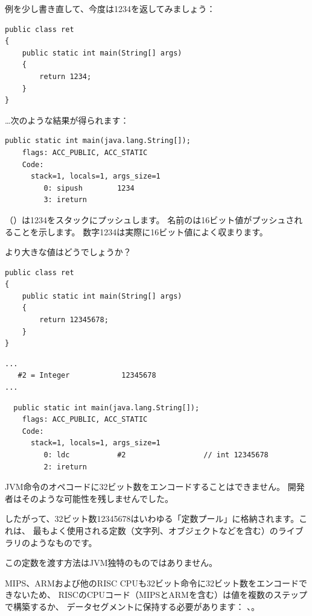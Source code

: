 例を少し書き直して、今度は1234を返してみましょう：

\begin{lstlisting}[style=customjava]
public class ret
{
	public static int main(String[] args)
	{
		return 1234;
	}
}
\end{lstlisting}

\dots 次のような結果が得られます：

\begin{lstlisting}[caption=JDK 1.7 (抜粋)]
  public static int main(java.lang.String[]);
    flags: ACC_PUBLIC, ACC_STATIC
    Code:
      stack=1, locals=1, args_size=1
         0: sipush        1234
         3: ireturn       
\end{lstlisting}

（）は1234をスタックにプッシュします。
名前のは16ビット値がプッシュされることを示します。
数字1234は実際に16ビット値によく収まります。

より大きな値はどうでしょうか？

\begin{lstlisting}[style=customjava]
public class ret
{
	public static int main(String[] args) 
	{
		return 12345678;
	}
}
\end{lstlisting}

\begin{lstlisting}[caption=定数プール]
...
   #2 = Integer            12345678
...
\end{lstlisting}

\begin{lstlisting}
  public static int main(java.lang.String[]);
    flags: ACC_PUBLIC, ACC_STATIC
    Code:
      stack=1, locals=1, args_size=1
         0: ldc           #2                  // int 12345678
         2: ireturn       
\end{lstlisting}

JVM命令のオペコードに32ビット数をエンコードすることはできません。
開発者はそのような可能性を残しませんでした。

したがって、32ビット数12345678はいわゆる「定数プール」に格納されます。これは、
最もよく使用される定数（文字列、オブジェクトなどを含む）のライブラリのようなものです。

この定数を渡す方法はJVM独特のものではありません。

MIPS、ARMおよび他のRISC CPUも32ビット命令に32ビット数をエンコードできないため、
RISCのCPUコード（MIPSとARMを含む）は値を複数のステップで構築するか、
データセグメントに保持する必要があります：
、。

